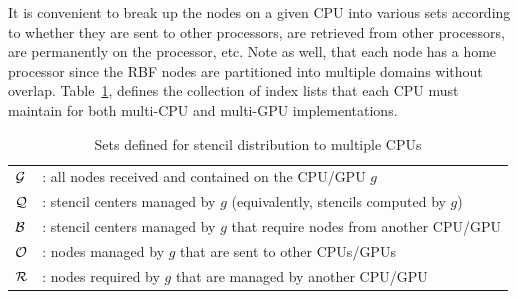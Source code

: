 \documentclass{report}
\begin{document}
It is convenient to break up the nodes on a given CPU into various sets
according to whether they are sent to other processors, are retrieved from 
other processors, are permanently on the processor, etc. Note as well, 
that each node has a home processor since the RBF nodes are partitioned into 
multiple domains without overlap.
Table~\ref{tbl:stencil_sets}, defines the collection of index lists that each CPU must maintain for both multi-CPU and multi-GPU implementations.  

        \begin{table}[t]
            \begin{center}
                \begin{tabular}{l l}
                    \hline
                    $\mathcal{G}$ &: all nodes received and contained on the CPU/GPU $g$ \\
                    $\mathcal{Q}$ &: stencil centers managed by $g$ 
					(equivalently, stencils computed by $g$) \\
                    $\mathcal{B}$ &: stencil centers managed by $g$ that
                    require nodes from another CPU/GPU \\
                    $\mathcal{O}$ &: nodes managed by $g$ that are sent to other CPUs/GPUs  \\
                    $\mathcal{R}$ &: nodes required by $g$ that are managed by another CPU/GPU \\
                    \hline
                \end{tabular}
                \caption{Sets defined for stencil distribution to multiple CPUs}
                            \label{tbl:stencil_sets}
            \end{center}
        \end{table}
        
\end{document}
